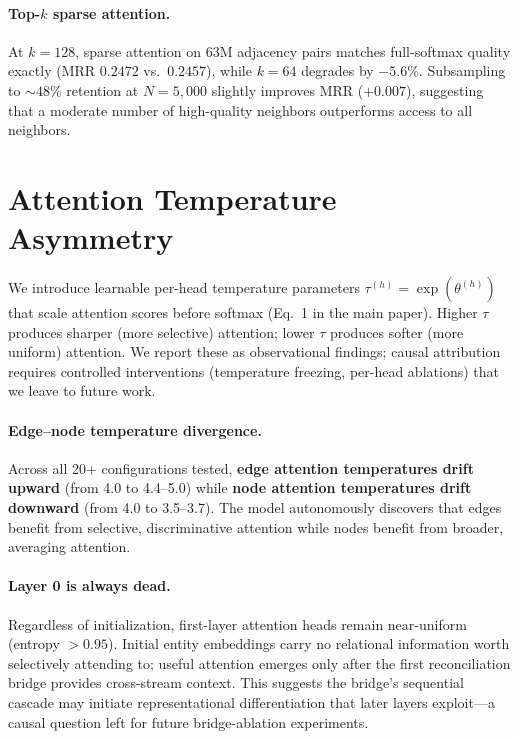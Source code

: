 \documentclass{article}
\begin{document}
\paragraph{Top-$k$ sparse attention.}
At $k{=}128$, sparse attention on 63M adjacency pairs matches full-softmax quality exactly (MRR $0.2472$ vs.\ $0.2457$), while $k{=}64$ degrades by $-5.6\%$. Subsampling to ${\sim}48\%$ retention at $N{=}5{,}000$ slightly improves MRR ($+0.007$), suggesting that a moderate number of high-quality neighbors outperforms access to all neighbors.

\section{Attention Temperature Asymmetry}
\label{app:temperature}

We introduce learnable per-head temperature parameters $\tau^{(h)} = \exp(\theta^{(h)})$ that scale attention scores before softmax (Eq.~1 in the main paper). Higher $\tau$ produces sharper (more selective) attention; lower $\tau$ produces softer (more uniform) attention. We report these as observational findings; causal attribution requires controlled interventions (temperature freezing, per-head ablations) that we leave to future work.

\paragraph{Edge--node temperature divergence.}
Across all 20+ configurations tested, \textbf{edge attention temperatures drift upward} (from 4.0 to 4.4--5.0) while \textbf{node attention temperatures drift downward} (from 4.0 to 3.5--3.7). The model autonomously discovers that edges benefit from selective, discriminative attention while nodes benefit from broader, averaging attention.

\paragraph{Layer 0 is always dead.}
Regardless of initialization, first-layer attention heads remain near-uniform (entropy $>0.95$). Initial entity embeddings carry no relational information worth selectively attending to; useful attention emerges only after the first reconciliation bridge provides cross-stream context. This suggests the bridge's sequential cascade may initiate representational differentiation that later layers exploit---a causal question left for future bridge-ablation experiments.
\end{document}
